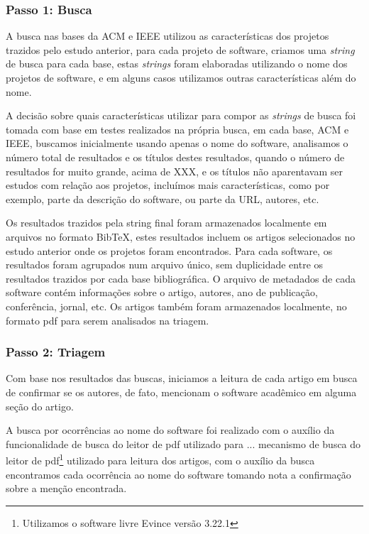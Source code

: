 \subsubsection{Passo 1: Busca}


A busca nas bases da ACM e IEEE utilizou as características dos projetos trazidos
pelo estudo anterior, para cada projeto de software, criamos uma {\it string} de
busca para cada base, estas {\it strings} foram elaboradas utilizando o nome dos
projetos de software, e em alguns casos utilizamos outras características além do
nome.

A decisão sobre quais características utilizar para compor as {\it strings} de busca
foi tomada com base em testes realizados na própria busca, em cada base, ACM e IEEE,
buscamos inicialmente usando apenas o nome do software, analisamos o número total
de resultados e os títulos destes resultados, quando o número de resultados for
muito grande, acima de XXX, e os títulos não aparentavam ser estudos com relação
aos projetos, incluímos mais características, como por exemplo, parte da descrição
do software, ou parte da URL, autores, etc.

Os resultados trazidos pela string final foram armazenados localmente em
arquivos no formato BibTeX, estes resultados incluem os artigos selecionados no
estudo anterior onde os projetos foram encontrados. Para cada software, os resultados foram agrupados
num arquivo único, sem duplicidade entre os resultados trazidos por cada base
bibliográfica. O arquivo de metadados de cada software contém informações sobre
o artigo, autores, ano de publicação, conferência, jornal, etc. Os artigos
também foram armazenados localmente, no formato pdf para serem analisados na
triagem.

\subsubsection{Passo 2: Triagem}


Com base nos resultados das buscas, iniciamos a leitura de cada artigo em busca
de confirmar se os autores, de fato, mencionam o software acadêmico em alguma
seção do artigo.

A busca por ocorrências ao nome do software foi realizado com o auxílio da
funcionalidade de busca do leitor de pdf utilizado para ...  mecanismo de busca
do leitor de pdf\footnote{Utilizamos o software livre Evince versão 3.22.1}
utilizado para leitura dos artigos, com o auxílio da busca encontramos cada
ocorrência ao nome do software tomando nota a confirmação sobre a menção
encontrada.

